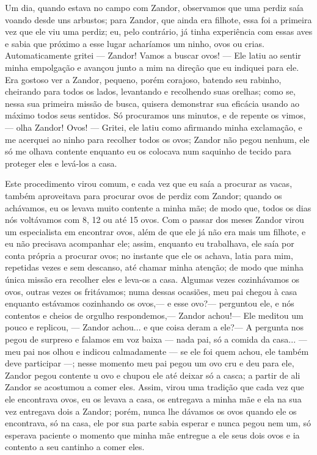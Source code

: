 Um dia, quando estava no campo com Zandor, observamos que uma perdiz saía voando desde uns arbustos; para Zandor, que ainda era filhote, essa foi a primeira vez que ele viu uma perdiz; eu, pelo contrário, já tinha experiência com essas aves e sabia que próximo a esse lugar acharíamos um ninho, ovos ou crias. 
Automaticamente gritei --- Zandor! Vamos a buscar ovos! --- Ele latiu ao sentir minha empolgação e avançou junto a mim na direção que eu indiquei para ele. 
Era gostoso ver a Zandor, pequeno, porém corajoso, batendo seu rabinho, cheirando para todos os lados, levantando e recolhendo suas orelhas; como se, nessa sua primeira missão de busca, quisera demonstrar sua eficácia usando ao máximo todos seus sentidos. 
Só procuramos uns minutos, e de repente os vimos, --- olha Zandor! Ovos! --- Gritei, ele latiu como afirmando minha exclamação, e me acerquei ao ninho para recolher todos os ovos; Zandor não pegou nenhum, ele só me olhava contente enquanto eu os colocava num saquinho de tecido para proteger eles e levá-los a casa. 

Este procedimento virou comum, e cada vez que eu saía a procurar as vacas, também aproveitava para procurar ovos de perdiz com Zandor; quando os achávamos, eu os levava muito contente a minha mãe; de modo que, todos os dias nós voltávamos com 8, 12 ou até 15 ovos. 
Com o passar dos meses Zandor virou um especialista em encontrar ovos, além de que ele já não era mais um filhote, e eu não precisava acompanhar ele; assim, enquanto eu trabalhava, ele saía por conta própria a procurar ovos; no instante que ele os achava, latia para mim, repetidas vezes e sem descanso, até chamar minha atenção; de modo que minha única missão era recolher eles e leva-os a casa.
Algumas vezes cozinhávamos os ovos, outras vezes os fritávamos; numa dessas ocasiões, meu pai chegou à casa enquanto estávamos cozinhando os ovos,--- e esse ovo?--- perguntou ele, e nós contentos e cheios de orgulho respondemos,--- Zandor achou!---
Ele meditou um pouco e replicou, --- Zandor achou... e que coisa deram a ele?--- A pergunta nos pegou de surpreso e falamos em voz baixa --- nada pai, só a comida da casa... --- meu pai nos olhou e indicou calmadamente --- se ele foi quem achou, ele também deve participar ---; 
nesse momento meu pai pegou um ovo cru e deu para ele, Zandor pegou contente u ovo e chupou ele até deixar só a casca; a partir de ali Zandor se acostumou a comer eles. Assim, virou uma tradição que cada vez que ele encontrava ovos, eu os levava a casa, os entregava a minha mãe e ela na sua vez entregava dois a Zandor; porém, nunca lhe dávamos os ovos quando ele os encontrava, só na casa, ele por sua parte sabia esperar e nunca pegou nem um, só esperava paciente o momento que minha mãe entregue a ele seus dois ovos e ia contento a seu cantinho a comer eles.


